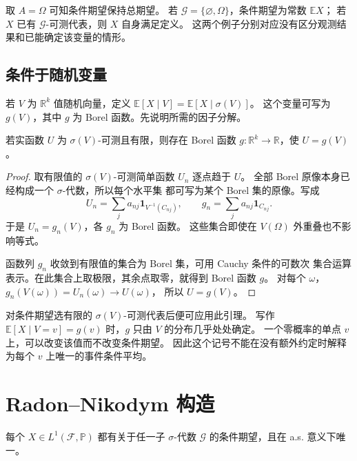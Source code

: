 取 $A=\Omega$ 可知条件期望保持总期望。
若 $\mathcal G=\{\varnothing,\Omega\}$，条件期望为常数 $\mathbb E X$；
若 $X$ 已有 $\mathcal G$-可测代表，则 $X$ 自身满足定义。
这两个例子分别对应没有区分观测结果和已能确定该变量的情形。

\subsection{条件于随机变量}

若 $V$ 为 $\mathbb R^k$ 值随机向量，定义
$\mathbb E[X\mid V]=\mathbb E[X\mid\sigma(V)]$。
这个变量可写为 $g(V)$，其中 $g$ 为 Borel 函数。先说明所需的因子分解。

\begin{lemma}[可测因子分解]
\label{lem:doob-dynkin-real}
若实函数 $U$ 为 $\sigma(V)$-可测且有限，则存在 Borel 函数
$g:\mathbb R^k\to\mathbb R$，使 $U=g(V)$。
\end{lemma}

\begin{proof}
取有限值的 $\sigma(V)$-可测简单函数 $U_n$ 逐点趋于 $U$。
全部 Borel 原像本身已经构成一个 $\sigma$-代数，所以每个水平集
都可写为某个 Borel 集的原像。写成
\[
 U_n=\sum_j a_{nj}\mathbf1_{V^{-1}(C_{nj})},\qquad
 g_n=\sum_j a_{nj}\mathbf1_{C_{nj}}.
\]
于是 $U_n=g_n(V)$，各 $g_n$ 为 Borel 函数。
这些集合即使在 $V(\Omega)$ 外重叠也不影响等式。

函数列 $g_n$ 收敛到有限值的集合为 Borel 集，可用 Cauchy 条件的可数次
集合运算表示。在此集合上取极限，其余点取零，就得到 Borel 函数 $g$。
对每个 $\omega$，$g_n(V(\omega))=U_n(\omega)\to U(\omega)$，
所以 $U=g(V)$。
\end{proof}

对条件期望选有限的 $\sigma(V)$-可测代表后便可应用此引理。
写作 $\mathbb E[X\mid V=v]=g(v)$ 时，$g$ 只由 $V$ 的分布几乎处处确定。
一个零概率的单点 $v$ 上，可以改变该值而不改变条件期望。
因此这个记号不能在没有额外约定时解释为每个 $v$ 上唯一的事件条件平均。

\section{Radon--Nikodym 构造}
\label{sec:conditional-radon-nikodym}

\begin{theorem}[存在性与唯一性]
\label{thm:conditional-expectation-existence}
每个 $X\in L^1(\mathcal F,\mathbb P)$ 都有关于任一子 $\sigma$-代数
$\mathcal G$ 的条件期望，且在 a.s. 意义下唯一。
\end{theorem}

